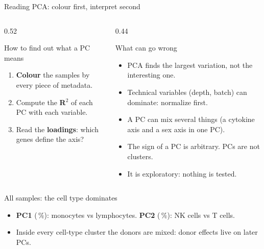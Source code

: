 \begin{frame}{Reading PCA: colour first, interpret second}
  \begin{columns}[T]
    \begin{column}{0.52\linewidth}
      \begin{block}{How to find out what a PC means}
        \small
        \begin{enumerate}\setlength\itemsep{3pt}
          \item \textbf{Colour} the samples by every piece of metadata.
          \item Compute the \textbf{R$^2$} of each PC with each variable.
          \item Read the \textbf{loadings}: which genes define the axis?
        \end{enumerate}
      \end{block}
    \end{column}
    \begin{column}{0.44\linewidth}
      \begin{block}{What can go wrong}
        \footnotesize
        \begin{itemize}\setlength\itemsep{2pt}
          \item PCA finds the \alert{largest} variation, not the interesting one.
          \item Technical variables (depth, batch) can dominate: normalize first.
          \item A PC can mix several things (a cytokine axis and a sex axis in one PC).
          \item The sign of a PC is arbitrary. PCs are not clusters.
          \item It is exploratory: nothing is tested.
        \end{itemize}
      \end{block}
    \end{column}
  \end{columns}
\end{frame}

\begin{frame}{All samples: the cell type dominates}
  \centering
  \begin{itemize}\small\setlength\itemsep{2pt}
    \item \textbf{PC1} (\numpcaone\,\%): monocytes vs lymphocytes. \textbf{PC2} (\numpcatwo\,\%): NK cells vs T cells.
    \item Inside every cell-type cluster the \alert{donors are mixed}: donor effects live on later PCs.
  \end{itemize}
\end{frame}

